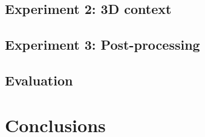 \subsection{Experiment 2: 3D context}
\subsection{Experiment 3: Post-processing}
\subsection{Evaluation}
\section{Conclusions} \label{disc:conclusions}

\endinput
